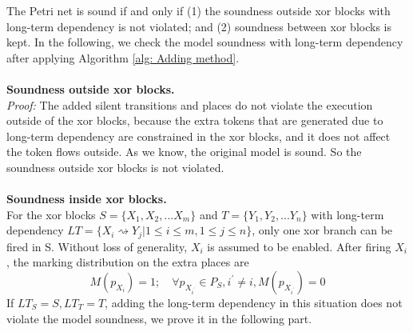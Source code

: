 The Petri net is sound if and only if (1) the soundness outside xor blocks with long-term dependency is not violated; and  (2) soundness between xor blocks is kept. In the following, we check the model soundness with long-term dependency after applying Algorithm \ref{alg: Adding method}. \\\\
\textbf{Soundness outside xor blocks.}\\
	\emph{Proof:} The added silent transitions and places do not violate the execution outside of the xor blocks, because the extra tokens that are generated due to long-term dependency are constrained in the xor blocks, and it does not affect the token flows outside. As we know, the original model is sound. So the soundness outside xor blocks is not violated.
\\\\
\textbf{Soundness inside xor blocks.}\\
For the xor blocks $S=\{X_1,X_2,...X_m\}$ and $T=\{Y_1,Y_2,...Y_n\}$ with long-term dependency $LT=\{X_i \rightsquigarrow Y_j \vert 1 \leq i \leq m, 1 \leq j \leq n \}$, only one xor branch can be fired in S. Without loss of generality, $X_i$ is assumed to be enabled. After firing $X_i$, the marking distribution on the extra places are  
\[ M(p_{X_i}) = 1; \quad 
\forall p_{X_{i^\prime}} \in P_S, i^\prime \neq i, M(p_{X_{i^\prime}})=0 \]
If $ LT_S = S, LT_T=T$, adding the long-term dependency in this situation does not violate the model soundness, we prove it in the following part.
